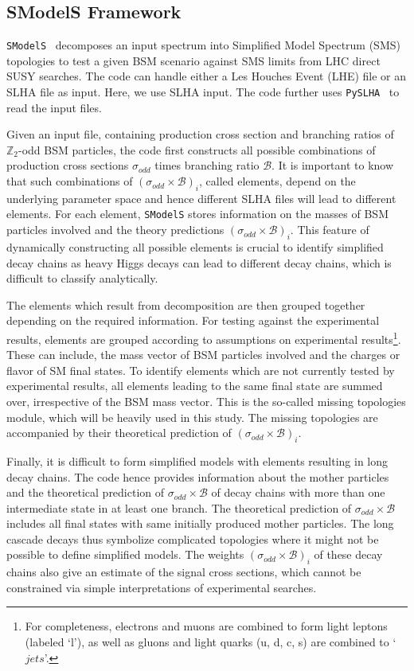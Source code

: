 \documentclass[11pt,a4paper]{article}
\begin{document}
\subsection*{SModelS Framework}
\noindent
\texttt{SModelS}~\cite{Ambrogi:2017neo,Kraml:2013mwa,SModelS:wiki} decomposes an input spectrum into Simplified Model Spectrum (SMS) topologies to test a given BSM scenario against SMS limits from LHC direct SUSY searches. The code can handle either a Les Houches Event (LHE) file or an SLHA file as input. Here, we use SLHA input. The code further uses \texttt{PySLHA}~\cite{Buckley:2013jua} to read the input files.

Given an input file, containing production cross section and branching ratios of $\mathbb{Z}_2$-odd BSM particles, the code first constructs all possible combinations of production cross sections $\sigma_{odd}$ times branching ratio $\mathcal{B}$. It is important to know that such combinations of $(\sigma_{odd}\times\mathcal{B})_i$, called elements, depend on the underlying parameter space and hence different SLHA files will lead to different elements. For each element, \texttt{SModelS} stores information on the masses of BSM particles involved and the theory predictions $(\sigma_{odd}\times\mathcal{B})_i$. This feature of dynamically constructing all possible elements is crucial to identify simplified decay chains as heavy Higgs decays can lead to different decay chains, which is difficult to classify analytically. 

The elements which result from decomposition are then grouped together depending on the required information. For testing against the experimental results, elements are grouped according to assumptions on experimental results\footnote{For completeness, electrons and muons are combined to form light leptons (labeled `l'), as well as gluons and light quarks (u, d, c, s) are combined to `$jets$'.}. These can include, the mass vector of BSM particles involved and the charges or flavor of SM final states. To identify elements which are not currently tested by experimental results, all elements leading to the same final state are summed over, irrespective of the BSM mass vector. This is the so-called missing topologies module, which will be heavily used in this study. The missing topologies are accompanied by their theoretical prediction of $(\sigma_{odd}\times\mathcal{B})_i$. 

Finally, it is difficult to form simplified models with elements resulting in  long decay chains. The code hence provides information about the mother particles and the theoretical prediction of $\sigma_{odd}\times\mathcal{B}$ of decay chains with more than one intermediate state in at least one branch. The theoretical prediction of $\sigma_{odd}\times\mathcal{B}$ includes all final states with same initially produced mother particles. The long cascade decays thus symbolize complicated topologies where it might not be possible to define simplified models. The weights $(\sigma_{odd}\times\mathcal{B})_i$ of these decay chains also give an estimate of the signal cross sections, which cannot be constrained via simple interpretations of experimental searches.
\end{document}
